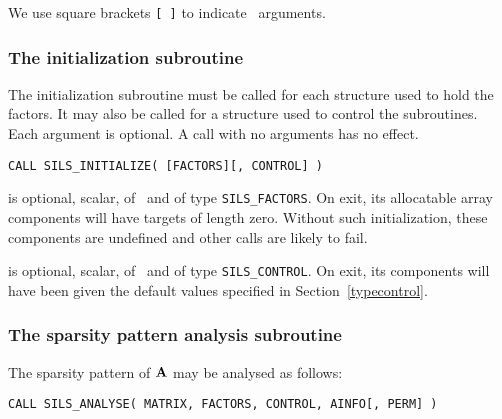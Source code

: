 \documentclass{galahad}
\newcommand{\packagename}{SILS}
\begin{document}

\galarguments
We use square brackets {\tt [ ]} to indicate \optional\ arguments.


\subsubsection{The initialization subroutine}\label{subinit}
The initialization subroutine must be called for each structure used
to hold the factors. It may also be called for a structure used to
control the subroutines. Each argument is optional. A call with no
arguments has no effect.

\hskip0.5in
{\tt CALL \packagename\_INITIALIZE( [FACTORS][, CONTROL] )}

\begin{description}

 is optional, scalar, of \intentout\ and of type
{\tt \packagename\_FACTORS}. On exit, its allocatable array components will have
targets of length zero.  Without such initialization, these components
are undefined and other calls are likely to fail.

 is optional, scalar, of \intentout\ and of type
{\tt \packagename\_CONTROL}. On exit, its components will have been
given the default values specified in Section~\ref{typecontrol}.

\end{description}


\subsubsection{The sparsity pattern analysis subroutine}
The sparsity pattern of ${\mathbf{A}}$ may be analysed as follows:

\hskip0.5in
{\tt CALL \packagename\_ANALYSE( MATRIX, FACTORS, CONTROL, AINFO[, PERM] )}
\end{document}
